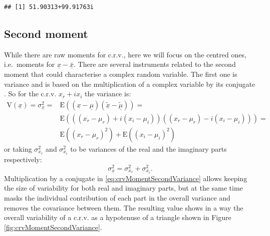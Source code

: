 \documentclass[
]{book}
\begin{document}
\begin{verbatim}
## [1] 51.90313+99.91763i
\end{verbatim}

\hypertarget{crvSecondMoment}{%
\subsection{Second moment}\label{crvSecondMoment}}

While there are raw moments for c.r.v., here we will focus on the centred ones, i.e.~moments for \(\underline{x}-\bar{\underline{x}}\). There are several instruments related to the second moment that could characterise a complex random variable. The first one is variance and is based on the multiplication of a complex variable by its conjugate \citep{Panchev1971}. So for the c.r.v. \(x_r + i x_i\) the variance is:
\begin{equation}
    \begin{aligned}
    \mathrm{V}(\underline{x}) = \sigma_{\underline{x}}^2 = & \mathrm{E}((\underline{x}-\underline{\mu}) (\tilde{\underline{x}}-\tilde{\underline{\mu}})) = \\
                 & \mathrm{E}\left(((x_r-\mu_{r}) + i (x_i-\mu_{i}))((x_r-\mu_{r}) - i (x_i-\mu_{i}))\right) = \\
                 & \mathrm{E}((x_r-\mu_{r})^2) +  \mathrm{E}((x_i-\mu_{i})^2)
    \end{aligned}
    \label{eq:crvMomentSecondVariance}
\end{equation}
or taking \(\sigma_{x_r}^2\) and \(\sigma_{x_i}^2\) to be variances of the real and the imaginary parts respectively:
\begin{equation}
    \sigma_{\underline{x}}^2 = \sigma_{x_r}^2 + \sigma_{x_i}^2.
    \label{eq:crvMomentSecondVarianceShort}
\end{equation}
Multiplication by a conjugate in \eqref{eq:crvMomentSecondVariance} allows keeping the size of variability for both real and imaginary parts, but at the same time masks the individual contribution of each part in the overall variance and removes the covariance between them. The resulting value shows in a way the overall variability of a c.r.v. as a hypotenuse of a triangle shown in Figure \ref{fig:crvMomentSecondVariance}.
\end{document}
